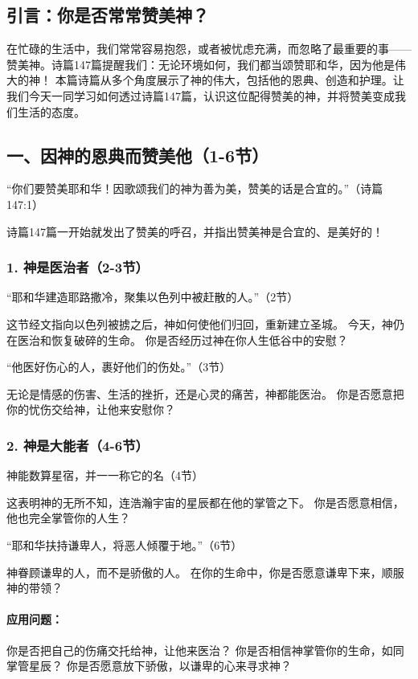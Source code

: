 \documentclass[a4paper, 12pt]{article}
\begin{document}
\subsection*{引言：你是否常常赞美神？}
在忙碌的生活中，我们常常容易抱怨，或者被忧虑充满，而忽略了最重要的事——赞美神。诗篇147篇提醒我们：无论环境如何，我们都当颂赞耶和华，因为他是伟大的神！
本篇诗篇从多个角度展示了神的伟大，包括他的恩典、创造和护理。让我们今天一同学习如何透过诗篇147篇，认识这位配得赞美的神，并将赞美变成我们生活的态度。

\subsection*{一、因神的恩典而赞美他（1-6节）}
“你们要赞美耶和华！因歌颂我们的神为善为美，赞美的话是合宜的。”（诗篇147:1）

诗篇147篇一开始就发出了赞美的呼召，并指出赞美神是合宜的、是美好的！

\subsubsection*{1. 神是医治者（2-3节）}
\hspace{0.4cm}“耶和华建造耶路撒冷，聚集以色列中被赶散的人。”（2节）

这节经文指向以色列被掳之后，神如何使他们归回，重新建立圣城。
今天，神仍在医治和恢复破碎的生命。 你是否经历过神在你人生低谷中的安慰？

“他医好伤心的人，裹好他们的伤处。”（3节）

无论是情感的伤害、生活的挫折，还是心灵的痛苦，神都能医治。
你是否愿意把你的忧伤交给神，让他来安慰你？
\subsubsection*{2. 神是大能者（4-6节）}
\hspace{0.6cm}神能数算星宿，并一一称它的名（4节）

这表明神的无所不知，连浩瀚宇宙的星辰都在他的掌管之下。
你是否愿意相信，他也完全掌管你的人生？

“耶和华扶持谦卑人，将恶人倾覆于地。”（6节）

神眷顾谦卑的人，而不是骄傲的人。
在你的生命中，你是否愿意谦卑下来，顺服神的带领？
\paragraph*{应用问题：}
你是否把自己的伤痛交托给神，让他来医治？
你是否相信神掌管你的生命，如同掌管星辰？
你是否愿意放下骄傲，以谦卑的心来寻求神？
\end{document}
